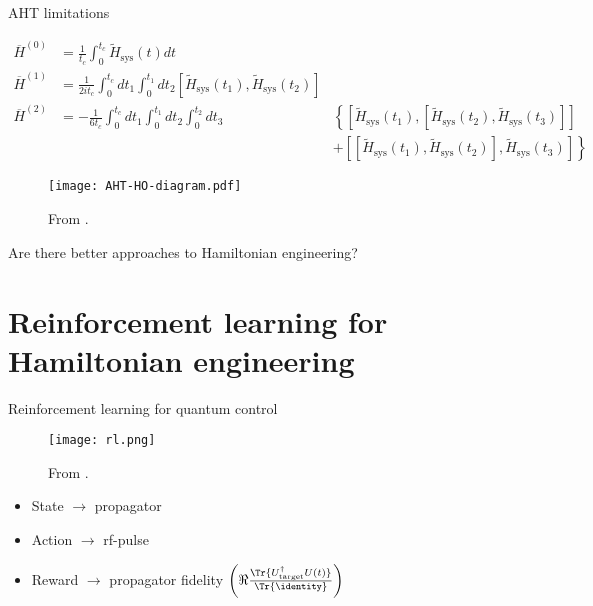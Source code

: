 \documentclass{beamer}
\begin{document}
\begin{frame}{AHT limitations}

{\footnotesize
\begin{align*}
    \overline{H}^{(0)} &= \frac{1}{t_c} \int_0^{t_c}
        \widetilde{H}_{\text{sys}}(t) dt \\
    \overline{H}^{(1)} &= \frac{1}{2it_c} \int_0^{t_c} dt_1 \int_0^{t_1} dt_2
        [\widetilde{H}_{\text{sys}}(t_1), \widetilde{H}_{\text{sys}}(t_2)] \\
    \overline{H}^{(2)} &= -\frac{1}{6t_c}
    \int_0^{t_c} dt_1 \int_0^{t_1} dt_2 \int_0^{t_2} dt_3 &
    \left\{
    \left[\widetilde{H}_{\text{sys}}(t_1), \left[\widetilde{H}_{\text{sys}}(t_2), \widetilde{H}_{\text{sys}}(t_3)\right]\right] \right. \\
    & & + \left.
    \left[\left[\widetilde{H}_{\text{sys}}(t_1), \widetilde{H}_{\text{sys}}(t_2)\right], \widetilde{H}_{\text{sys}}(t_3)\right]
    \right\}
\end{align*}
}
\begin{figure}
\centering
\texttt{[image: AHT-HO-diagram.pdf]}

From \cite{brinkmann_2016}.
\end{figure}

\pause

Are there better approaches to Hamiltonian engineering?


\end{frame}



\section{Reinforcement learning for Hamiltonian engineering}

\begin{frame}{Reinforcement learning for quantum control}

\begin{figure}
\centering
\texttt{[image: rl.png]}

From \cite{sutton2018reinforcement}.
\end{figure}

\begin{itemize}
    \item State $\to$ propagator
    \item Action $\to$ rf-pulse
    \item Reward $\to$ propagator fidelity $\left(\Re{
        \frac{\Tr{U_\text{target}^\dagger U(t)}}{\Tr{\identity}}
    }\right)$
\end{itemize}
    
\end{frame}
\end{document}
